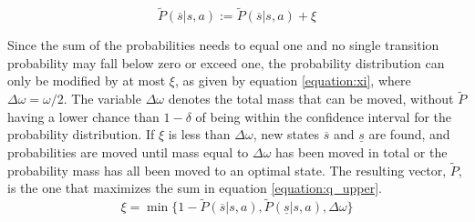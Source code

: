 \begin{equation}
\label{equation:ptilde_roof}
\tilde{P}(\overline{s}|s,a) := \tilde{P}(\overline{s}|s,a)+\xi
\end{equation}

Since the sum of the probabilities needs to equal one and 
no single transition probability may fall below zero or exceed one, the probability distribution can only be modified by at most $\xi$, as given by
equation \eqref{equation:xi}, where $\Delta\omega = \omega / 2$. The variable $\Delta\omega$ denotes the total mass that can be moved, without $\tilde{P}$ having a lower chance than $1 - \delta$ of being within the confidence interval for the probability distribution. If $\xi$ is less than $\Delta \omega$, new states
$\overline{s}$ and $\underline{s}$ are found, and probabilities are moved until
mass equal to $\Delta \omega$ has been moved in total or the probability mass has all been moved to an optimal state. 
The resulting vector, $\tilde{P}$, is the one that maximizes the sum in equation \eqref{equation:q_upper}.
\begin{equation}
\label{equation:xi}
\xi = \min\{
  1 - \tilde{P}(\overline{s} | s, a)
  , \tilde{P}(\underline{s} | s, a)
  , \Delta \omega 
\}
\end{equation}
